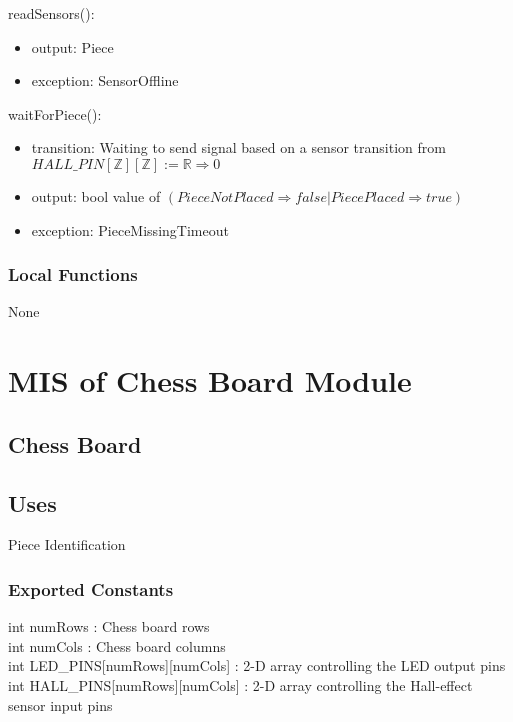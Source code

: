 \documentclass[12pt, titlepage]{article}
\begin{document}
\noindent readSensors():
\begin{itemize}
\item output: Piece
\item exception: SensorOffline
\end{itemize}

\noindent waitForPiece():
\begin{itemize}
\item transition: Waiting to send signal based on a sensor transition from\\$HALL\_PIN[\mathbb{Z}][\mathbb{Z}] := \mathbb{R} \Rightarrow 0$
\item output: bool value of $(Piece Not Placed \Rightarrow false | Piece Placed \Rightarrow true)$
\item exception: PieceMissingTimeout
\end{itemize}

\subsubsection{Local Functions}{
  None
}

\newpage

\section{MIS of Chess Board Module} \label{ChessBoardModule} 

\subsection{Chess Board}

\subsection{Uses}
Piece Identification\\

\subsubsection{Exported Constants}{
int numRows : Chess board rows \\
int numCols : Chess board columns \\
int LED\_PINS[numRows][numCols] : 2-D array controlling the LED output pins \\
int HALL\_PINS[numRows][numCols] : 2-D array controlling the Hall-effect sensor input pins \\
}
\end{document}

